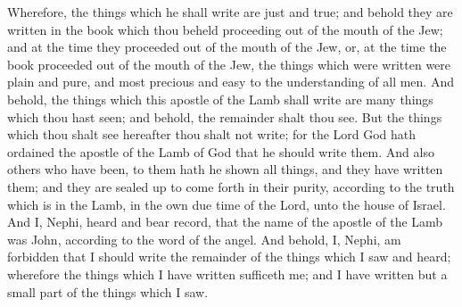\bverse \iffalse Wherefore, the things which he shall write are just and true; and behold they are written in the book which thou beheld proceeding out of the mouth of the Jew; and at the time they proceeded out of the mouth of the Jew, or, at the time the book proceeded out of the mouth of the Jew, the things which were written were plain and pure, and most precious and easy to the understanding of all men. \fi
Wherefore, the things which he shall write are just and true; and behold they are written in the book which thou beheld proceeding out of the mouth of the Jew; and at the time they proceeded out of the mouth of the Jew, or, at the time the book proceeded out of the mouth of the Jew, the things which were written were plain and pure, and most precious and easy to the understanding of all men.
\bverse \iffalse And behold, the things which this apostle of the Lamb shall write are many things which thou hast seen; and behold, the remainder shalt thou see. \fi
And behold, the things which this apostle of the Lamb shall write are many things which thou hast seen; and behold, the remainder shalt thou see.
\bverse \iffalse But the things which thou shalt see hereafter thou shalt not write; for the Lord God hath ordained the apostle of the Lamb of God that he should write them. \fi
But the things which thou shalt see hereafter thou shalt not write; for the Lord God hath ordained the apostle of the Lamb of God that he should write them.
\bverse \iffalse And also others who have been, to them hath he shown all things, and they have written them; and they are sealed up to come forth in their purity, according to the truth which is in the Lamb, in the own due time of the Lord, unto the house of Israel. \fi
And also others who have been, to them hath he shown all things, and they have written them; and they are sealed up to come forth in their purity, according to the truth which is in the Lamb, in the own due time of the Lord, unto the house of Israel.
\bverse \iffalse And I, Nephi, heard and bear record, that the name of the apostle of the Lamb was John, according to the word of the angel. \fi
And I, Nephi, heard and bear record, that the name of the apostle of the Lamb was John, according to the word of the angel.
\bverse \iffalse And behold, I, Nephi, am forbidden that I should write the remainder of the things which I saw and heard; wherefore the things which I have written sufficeth me; and I have written but a small part of the things which I saw. \fi
And behold, I, Nephi, am forbidden that I should write the remainder of the things which I saw and heard; wherefore the things which I have written sufficeth me; and I have written but a small part of the things which I saw.

